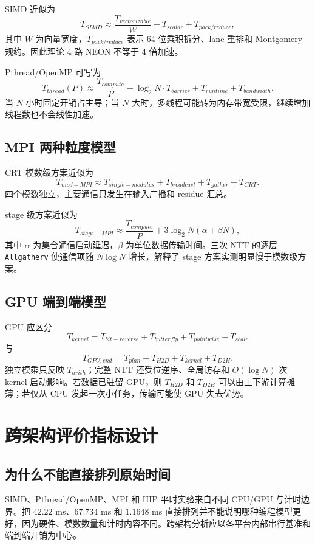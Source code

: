 SIMD 近似为
\[
T_{SIMD}\approx \frac{T_{vectorizable}}W
+T_{scalar}+T_{pack/reduce},
\]
其中 $W$ 为向量宽度，$T_{pack/reduce}$ 表示 64 位乘积拆分、lane 重排和 Montgomery 规约。因此理论 4 路 NEON 不等于 4 倍加速。

Pthread/OpenMP 可写为
\[
T_{thread}(P)\approx \frac{T_{compute}}P
+\log_2N\cdot T_{barrier}
+T_{runtime}+T_{bandwidth}.
\]
当 $N$ 小时固定开销占主导；当 $N$ 大时，多线程可能转为内存带宽受限，继续增加线程数也不会线性加速。

\subsection{MPI 两种粒度模型}

CRT 模数级方案近似为
\[
T_{mod-MPI}\approx T_{single-modulus}
+T_{broadcast}+T_{gather}+T_{CRT}.
\]
四个模数独立，主要通信只发生在输入广播和 residue 汇总。

stage 级方案近似为
\[
T_{stage-MPI}\approx \frac{T_{compute}}P
+3\log_2N(\alpha+\beta N),
\]
其中 $\alpha$ 为集合通信启动延迟，$\beta$ 为单位数据传输时间。三次 NTT 的逐层 \texttt{Allgatherv} 使通信项随 $N\log N$ 增长，解释了 stage 方案实测明显慢于模数级方案。

\subsection{GPU 端到端模型}

GPU 应区分
\[
T_{kernel}=T_{bit-reverse}+T_{butterfly}+T_{pointwise}+T_{scale}
\]
与
\[
T_{GPU,end}=T_{plan}+T_{H2D}+T_{kernel}+T_{D2H}.
\]
独立模乘只反映 $T_{arith}$；完整 NTT 还受位逆序、全局访存和 $O(\log N)$ 次 kernel 启动影响。若数据已驻留 GPU，则 $T_{H2D}$ 和 $T_{D2H}$ 可以由上下游计算摊薄；若仅从 CPU 发起一次小任务，传输可能使 GPU 失去优势。

\section{跨架构评价指标设计}\newwork

\subsection{为什么不能直接排列原始时间}

SIMD、Pthread/OpenMP、MPI 和 HIP 平时实验来自不同 CPU/GPU 与计时边界。把 $42.22$ ms、$67.734$ ms 和 $1.1648$ ms 直接排列并不能说明哪种编程模型更好，因为硬件、模数数量和计时内容不同。跨架构分析应以各平台内部串行基准和端到端开销为中心。

